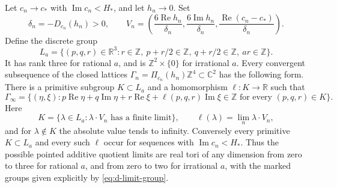 \begin{theorem}
Let \(c_n\to c_*\) with \(\operatorname{Im}c_n<H_*\), and let
\(h_n\to0\). Set
\[
 \delta_n=-D_{c_n}(h_n)>0,\qquad
 V_n=\left(\frac{6\operatorname{Re}h_n}{\delta_n},
           \frac{6\operatorname{Im}h_n}{\delta_n},
           \frac{\operatorname{Re}(c_n-c_*)}{\delta_n}\right).
\]
Define the discrete group
\[
 L_a=\{(p,q,r)\in\mathbb R^3:
    r\in\mathbb Z,\ p+r/2\in\mathbb Z,
    \ q+r/2\in\mathbb Z,\ ar\in\mathbb Z\}.
\]
It has rank three for rational \(a\), and is
\(\mathbb Z^2\times\{0\}\) for irrational \(a\).
Every convergent subsequence of the closed lattices
\(\Gamma_n=\Pi_{c_n}(h_n)\mathbb Z^4\subset\mathbb C^2\) has the
following form. There is a primitive subgroup \(K\subset L_a\) and
a homomorphism \(\ell:K\to\mathbb R\) such that
\begin{equation}\label{eq:d-limit-group}
 \Gamma_\infty=
 \{(\eta,\xi):p\operatorname{Re}\eta+q\operatorname{Im}\eta
       +r\operatorname{Re}\xi+\ell(p,q,r)\operatorname{Im}\xi
       \in\mathbb Z\text{ for every }(p,q,r)\in K\}.
\end{equation}
Here
\[
 K=\{\lambda\in L_a:\lambda\cdot V_n
                      \text{ has a finite limit}\},\qquad
 \ell(\lambda)=\lim_n\lambda\cdot V_n,
\]
and for \(\lambda\notin K\) the absolute value tends to infinity.
Conversely every primitive \(K\subset L_a\) and every such
\(\ell\) occur for sequences with \(\operatorname{Im}c_n<H_*\).
Thus the possible pointed additive quotient limits are real tori of
any dimension from zero to three for rational \(a\), and from zero
to two for irrational \(a\), with the marked groups given explicitly
by \eqref{eq:d-limit-group}.
\end{theorem}


